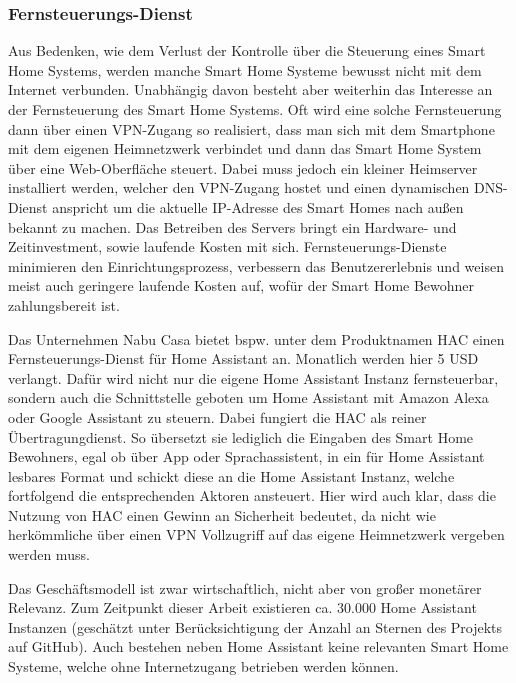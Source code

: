 
\subsubsection{Fernsteuerungs-Dienst} %

Aus Bedenken, wie dem Verlust der Kontrolle über die Steuerung eines Smart Home Systems, werden manche Smart Home Systeme bewusst nicht mit dem Internet verbunden.
Unabhängig davon besteht aber weiterhin das Interesse an der Fernsteuerung des Smart Home Systems.
Oft wird eine solche Fernsteuerung dann über einen \ac{VPN}-Zugang so realisiert, dass man sich mit dem Smartphone mit dem eigenen Heimnetzwerk verbindet und dann das Smart Home System über eine Web-Oberfläche steuert.
Dabei muss jedoch ein kleiner Heimserver installiert werden, welcher den \ac{VPN}-Zugang hostet und einen dynamischen \ac{DNS}-Dienst anspricht um die aktuelle IP-Adresse des Smart Homes nach außen bekannt zu machen.
Das Betreiben des Servers bringt ein Hardware- und Zeitinvestment, sowie laufende Kosten mit sich.
Fernsteuerungs-Dienste minimieren den Einrichtungsprozess, verbessern das Benutzererlebnis und weisen meist auch geringere laufende Kosten auf, wofür der Smart Home Bewohner zahlungsbereit ist.

Das Unternehmen Nabu Casa bietet bspw. unter dem Produktnamen \ac{HAC} einen Fernsteuerungs-Dienst für Home Assistant an.
Monatlich werden hier 5 USD verlangt.
Dafür wird nicht nur die eigene Home Assistant Instanz fernsteuerbar, sondern auch die Schnittstelle geboten um Home Assistant mit Amazon Alexa oder Google Assistant zu steuern.
Dabei fungiert die \ac{HAC} als reiner Übertragungdienst.
So übersetzt sie lediglich die Eingaben des Smart Home Bewohners, egal ob über App oder Sprachassistent, in ein für Home Assistant lesbares Format und schickt diese an die Home Assistant Instanz, welche fortfolgend die entsprechenden Aktoren ansteuert.
Hier wird auch klar, dass die Nutzung von \ac{HAC} einen Gewinn an Sicherheit bedeutet, da nicht wie herkömmliche über einen \ac{VPN} Vollzugriff auf das eigene Heimnetzwerk vergeben werden muss.

Das Geschäftsmodell ist zwar wirtschaftlich, nicht aber von großer monetärer Relevanz.
Zum Zeitpunkt dieser Arbeit existieren ca. 30.000 Home Assistant Instanzen (geschätzt unter Berücksichtigung der Anzahl an Sternen des Projekts auf GitHub).
Auch bestehen neben Home Assistant keine relevanten Smart Home Systeme, welche ohne Internetzugang betrieben werden können.

